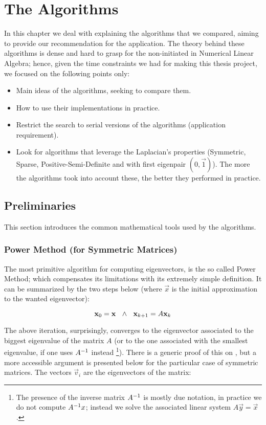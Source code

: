 \chapter{The Algorithms}

In this chapter we deal with explaining the algorithms that we
compared, aiming to provide our recommendation for the
application. The theory behind these algorithms is dense and hard to
grasp for the non-initiated in Numerical Linear Algebra; hence, given
the time constraints we had for making this thesis project, we focused
on the following points only:

\begin{itemize}
\item Main ideas of the algorithms, seeking to compare them.
\item How to use their implementations in practice.
\item Restrict the search to serial versions of the algorithms
  (application requirement).
\item Look for algorithms that leverage the Laplacian's properties
  (Symmetric, Sparse, Positive-Semi-Definite and with first eigenpair
  $(0,\vec{1})$). The more the algorithms took into account these, the
  better they performed in practice. 
\end{itemize}

\section{Preliminaries}

This section introduces the common mathematical tools used by the
algorithms.

\subsection{Power Method (for Symmetric Matrices)}

The most primitive algorithm for computing eigenvectors, is the so
called Power Method; which compensates its limitations with its
extremely simple definition. It can be summarized by the
two steps below (where $\vec{x}$ is the initial approximation to the
wanted eigenvector):

\begin{equation*}
    \mathbf{x}_0 = \mathbf{x} \,\,\,\,\land\,\,\,\,
    \mathbf{x}_{k+1} = A\mathbf{x}_k  
\end{equation*}
\joinbelow{1cm}

The above iteration, surprisingly, converges to the eigenvector
associated to the biggest eigenvalue of the matrix $A$ (or to the one
associated with the smallest eigenvalue, if one uses ${A}^{-1}$ instead
\footnote{The presence of the inverse matrix ${A}^{-1}$ is mostly due
  notation, in practice we do not compute ${A}^{-1}x$; instead we solve the
  associated linear system $A\vec{y} = \vec{x}$.}). There is a
generic proof of this on \cite{saad92}, but a more accessible argument
is presented below for the particular case of symmetric matrices. The vectors
$\vec{v}_i$ are the eigenvectors of the matrix:

